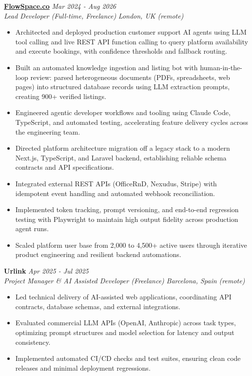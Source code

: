 \documentclass[10pt,a4paper]{article}
\newcommand{\role}[4]{
  \vspace{2pt}
  \noindent\textbf{#1} \hfill \textit{#2} \\
  \textit{\color{text}#3} \hfill \textit{\color{text}#4}
  \vspace{1pt}
}
\begin{document}
\role{\href{https://flowspace.co}{FlowSpace.co}}{Mar 2024 - Aug 2026}{Lead Developer (Full-time, Freelance)}{London, UK (remote)}
\begin{itemize}
  \item Architected and deployed production customer support AI agents using LLM tool calling and live REST API function calling to query platform availability and execute bookings, with confidence thresholds and fallback routing.
  \item Built an automated knowledge ingestion and listing bot with human-in-the-loop review: parsed heterogeneous documents (PDFs, spreadsheets, web pages) into structured database records using LLM extraction prompts, creating 900+ verified listings.
  \item Engineered agentic developer workflows and tooling using Claude Code, TypeScript, and automated testing, accelerating feature delivery cycles across the engineering team.
  \item Directed platform architecture migration off a legacy stack to a modern Next.js, TypeScript, and Laravel backend, establishing reliable schema contracts and API specifications.
  \item Integrated external REST APIs (OfficeRnD, Nexudus, Stripe) with idempotent event handling and automated webhook reconciliation.
  \item Implemented token tracking, prompt versioning, and end-to-end regression testing with Playwright to maintain high output fidelity across production agent runs.
  \item Scaled platform user base from 2,000 to 4,500+ active users through iterative product engineering and resilient backend automations.
\end{itemize}

\role{Urlink}{Apr 2025 - Jul 2025}{Project Manager \& AI Assisted Developer (Freelance)}{Barcelona, Spain (remote)}
\begin{itemize}
  \item Led technical delivery of AI-assisted web applications, coordinating API contracts, database schemas, and external integrations.
  \item Evaluated commercial LLM APIs (OpenAI, Anthropic) across task types, optimizing prompt structures and model selection for latency and output consistency.
  \item Implemented automated CI/CD checks and test suites, ensuring clean code releases and minimal deployment regressions.
\end{itemize}
\end{document}
